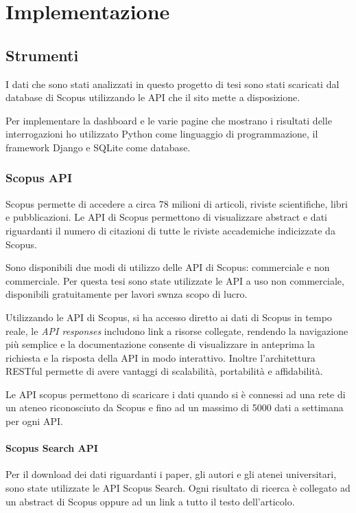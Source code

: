 \chapter{Implementazione}

\section{Strumenti}

I dati che sono stati analizzati in questo progetto di tesi sono stati scaricati dal database di Scopus utilizzando le API che il sito 
mette a disposizione.

Per implementare la dashboard e le varie pagine che mostrano i risultati delle interrogazioni ho utilizzato Python come 
linguaggio di programmazione, il framework Django e SQLite come database.


\subsection{Scopus API}
Scopus permette di accedere a circa 78 milioni di articoli, riviste scientifiche, libri e pubblicazioni.
Le API di Scopus permettono di visualizzare abstract e dati riguardanti il numero di citazioni di tutte le riviste accademiche
indicizzate da Scopus. 

Sono disponibili due modi di utilizzo delle API di Scopus: commerciale e non commerciale. Per questa tesi sono state utilizzate le API a uso 
non commerciale, disponibili gratuitamente per lavori swnza scopo di lucro.

Utilizzando le API di Scopus, si ha accesso diretto ai dati di Scopus in tempo reale, le \textit{API responses} includono link a risorse collegate, rendendo
la navigazione più semplice e la documentazione consente di visualizzare in anteprima la richiesta e la risposta della API in modo interattivo.
Inoltre l'architettura RESTful permette di avere vantaggi di scalabilità, portabilità e affidabilità.

Le API scopus permettono di scaricare i dati quando si è connessi ad una rete di un ateneo riconosciuto da Scopus e fino ad un massimo di 5000 dati a settimana 
per ogni API.


\subsubsection{Scopus Search API}
Per il download dei dati riguardanti i paper, gli autori e gli atenei universitari, sono state utilizzate le API Scopus Search. Ogni risultato di ricerca 
è collegato ad un abstract di Scopus oppure ad un link a tutto il testo dell'articolo. 

